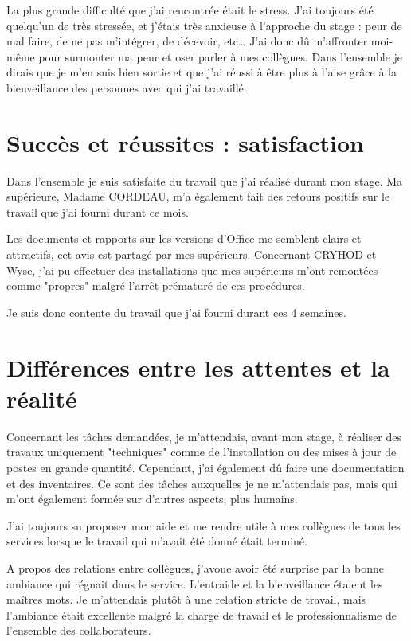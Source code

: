 La plus grande difficulté que j’ai rencontrée était le stress. J’ai toujours été quelqu’un de très stressée, et j’étais très anxieuse à l’approche du stage : peur de mal faire, de ne pas m’intégrer, de décevoir, etc\dots
J’ai donc dû m’affronter moi-même pour surmonter ma peur et oser parler à mes collègues. Dans l’ensemble je dirais que je m’en suis bien sortie et que j’ai réussi à être plus à l’aise grâce à la bienveillance des personnes avec qui j’ai travaillé.


\section{Succès et réussites : satisfaction}

Dans l'ensemble je suis satisfaite du travail que j'ai réalisé durant mon stage. Ma supérieure, Madame CORDEAU, m'a également fait des retours positifs sur le travail que j'ai fourni durant ce mois.

Les documents et rapports sur les versions d'Office me semblent clairs et attractifs, cet avis est partagé par mes supérieurs. Concernant CRYHOD et Wyse, j'ai pu effectuer des installations que mes supérieurs m'ont remontées comme "propres" malgré l'arrêt prématuré de ces procédures.

Je suis donc contente du travail que j'ai fourni durant ces 4 semaines.


\section{Différences entre les attentes et la réalité}

Concernant les tâches demandées, je m’attendais, avant mon stage, à réaliser des travaux uniquement "techniques" comme de l’installation ou des mises à jour de postes en grande quantité. Cependant, j’ai également dû faire une documentation et des inventaires. Ce sont des tâches auxquelles je ne m’attendais pas, mais qui m’ont également formée sur d’autres aspects, plus humains.

J’ai toujours su proposer mon aide et me rendre utile à mes collègues de tous les services lorsque le travail qui m’avait été donné était terminé.

A propos des relations entre collègues, j’avoue avoir été surprise par la bonne ambiance qui régnait dans le service. L’entraide et la bienveillance étaient les maîtres mots. Je m’attendais plutôt à une relation stricte de travail, mais l’ambiance était excellente malgré la charge de travail et le professionnalisme de l’ensemble des collaborateurs.



